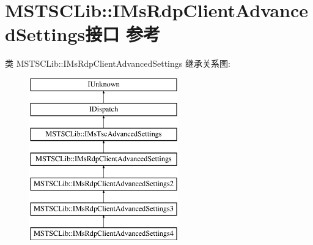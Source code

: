 \hypertarget{interface_m_s_t_s_c_lib_1_1_i_ms_rdp_client_advanced_settings}{}\section{M\+S\+T\+S\+C\+Lib\+:\+:I\+Ms\+Rdp\+Client\+Advanced\+Settings接口 参考}
\label{interface_m_s_t_s_c_lib_1_1_i_ms_rdp_client_advanced_settings}
类 M\+S\+T\+S\+C\+Lib\+:\+:I\+Ms\+Rdp\+Client\+Advanced\+Settings 继承关系图\+:\begin{figure}[H]
\begin{center}
\leavevmode
\includegraphics[height=7.000000cm]{interface_m_s_t_s_c_lib_1_1_i_ms_rdp_client_advanced_settings}
\end{center}
\end{figure}
